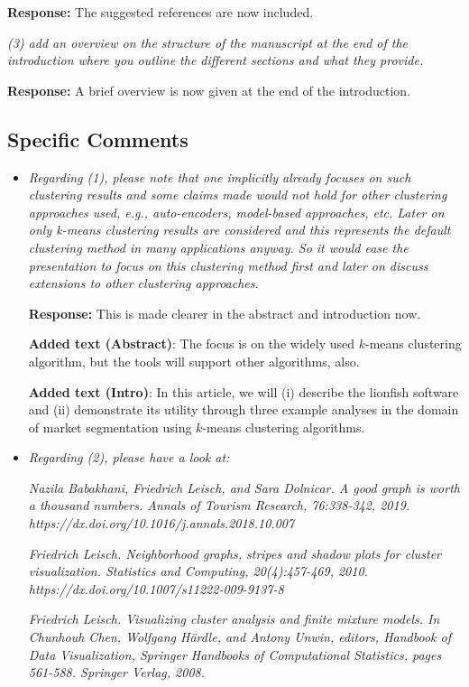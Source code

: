 \documentclass[12pt]{article}
\begin{document}
    \textbf{Response:} The suggested references are now included.

\textit{(3) add an overview on the structure of the manuscript at the end of the
introduction where you outline the different sections and what they provide.}

    \textbf{Response:} A brief overview is now given at the end of the introduction.

\subsection*{Specific Comments}

\begin{itemize}

    \item \textit{Regarding (1), please note that one implicitly already focuses on such clustering results and some claims made would not hold for other clustering approaches used, e.g., auto-encoders, model-based approaches, etc. Later on only k-means clustering results are considered and this represents the default clustering method in many applications anyway. So it would ease the presentation to focus on this clustering method first and later on discuss extensions to other clustering approaches.}

    \textbf{Response:} This is made clearer in the abstract and introduction now.
    
    \textbf{Added text (Abstract)}: The focus is on the widely used $k$-means clustering algorithm, but the tools will support other algorithms, also.
        
        \textbf{Added text (Intro)}: In this article, we will (i) describe the lionfish software and (ii) demonstrate its utility through three example analyses in the domain of market segmentation using $k$-means clustering algorithms.
            
	\item \textit{Regarding (2), please have a look at:}

\textit{Nazila Babakhani, Friedrich Leisch, and Sara Dolnicar. A good graph is
worth a thousand numbers. Annals of Tourism Research, 76:338-342, 2019.
https://dx.doi.org/10.1016/j.annals.2018.10.007}

\textit{Friedrich Leisch. Neighborhood graphs, stripes and shadow plots for cluster
visualization. Statistics and Computing, 20(4):457-469, 2010.
https://dx.doi.org/10.1007/s11222-009-9137-8}

\textit{Friedrich Leisch. Visualizing cluster analysis and finite mixture models.
In Chunhouh Chen, Wolfgang Härdle, and Antony Unwin, editors, Handbook of
Data Visualization, Springer Handbooks of Computational Statistics, pages
561-588. Springer Verlag, 2008.}


\end{itemize}
\end{document}
